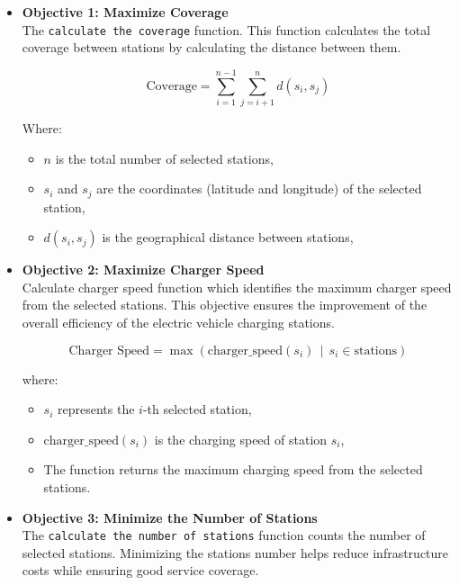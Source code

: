 \begin{itemize}
    \item \textbf{Objective 1: Maximize Coverage} \\
    The \texttt{calculate the coverage} function. This function calculates the total coverage between stations by calculating the distance between them. 

    \begin{equation}
    \text{Coverage} = \sum_{i=1}^{n-1} \sum_{j=i+1}^{n} d(s_i, s_j)
    \end{equation}

    \noindent
    Where:
    \begin{itemize}
        \item $n$ is the total number of selected stations,
        \item $s_i$ and $s_j$ are the coordinates (latitude and longitude) of the selected station,
        \item $d(s_i, s_j)$ is the geographical distance between stations,
    \end{itemize}
    \noindent
    
    \item \textbf{Objective 2: Maximize Charger Speed} \\
    Calculate charger speed function which identifies the maximum charger speed from the selected stations. This objective ensures the improvement of the overall efficiency of the electric vehicle charging stations.

    \begin{equation}
    \text{Charger Speed} = \max \left( \text{charger\_speed}(s_i) \, \middle| \, s_i \in \text{stations} \right)
    \end{equation}
    
    where:
    \begin{itemize}
        \item $s_i$ represents the $i$-th selected station,
        \item $\text{charger\_speed}(s_i)$ is the charging speed of station $s_i$,
        \item The function returns the maximum charging speed from the selected stations.
    \end{itemize}
    \noindent

    
    \item \textbf{Objective 3: Minimize the Number of Stations} \\
    The \texttt{calculate the number of stations} function counts the number of selected stations. Minimizing the stations number helps reduce infrastructure costs while ensuring good service coverage.


\end{itemize}

